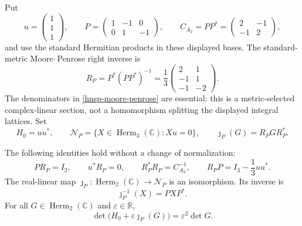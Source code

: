 Put
\begin{equation}
 u=\begin{pmatrix}1\\1\\1\end{pmatrix},\qquad
 P=\begin{pmatrix}1&-1&0\\0&1&-1\end{pmatrix},\qquad
 C_{A_2}=PP^*=\begin{pmatrix}2&-1\\-1&2\end{pmatrix},
 \label{hnsp-fixed-data}
\end{equation}
and use the standard Hermitian products in these displayed bases.  The
standard-metric Moore--Penrose right inverse is
\begin{equation}
 R_P=P^*(PP^*)^{-1}
 =\frac13\begin{pmatrix}2&1\\-1&1\\-1&-2\end{pmatrix}.
 \label{hnsp-moore-penrose}
\end{equation}
The denominators in \eqref{hnsp-moore-penrose} are essential: this is a
metric-selected complex-linear section, not a homomorphism splitting the
displayed integral lattices.
Set
\begin{equation}
 H_0=uu^*,\qquad
 \mathcal N_P=\{X\in\operatorname{Herm}_3(\mathbb C):Xu=0\},\qquad
 \jmath_P(G)=R_P G R_P^*.
 \label{hnsp-normal-space}
\end{equation}

\begin{proposition}
\label{hnsp-normal-identification}
The following identities hold without a change of normalization:
\begin{equation}
 PR_P=I_2,\qquad u^*R_P=0,\qquad
 R_P^*R_P=C_{A_2}^{-1},\qquad
 R_P P=I_3-\frac13uu^*.
 \label{hnsp-right-inverse-identities}
\end{equation}
The real-linear map
\(
 \jmath_P:\operatorname{Herm}_2(\mathbb C)\to\mathcal N_P
\)
is an isomorphism.  Its inverse is
\begin{equation}
 \jmath_P^{-1}(X)=PXP^*.
 \label{hnsp-normal-inverse}
\end{equation}
For all \(G\in\operatorname{Herm}_2(\mathbb C)\) and
\(\varepsilon\in\mathbb R\),
\begin{equation}
 \det\bigl(H_0+\varepsilon\jmath_P(G)\bigr)
 =\varepsilon^2\det G.
 \label{hnsp-determinant-identity}
\end{equation}
\end{proposition}


